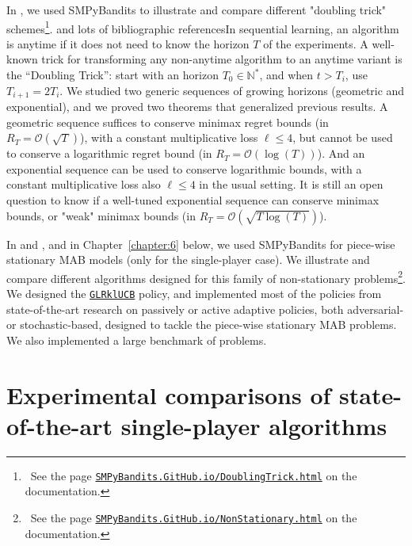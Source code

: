 In \cite{Besson2018DoublingTricks}, we used SMPyBandits to illustrate and compare different "doubling trick" schemes\footnote{~See the page \texttt{\href{https://SMPyBandits.GitHub.io/DoublingTrick.html}{SMPyBandits.GitHub.io/DoublingTrick.html}} on the documentation.}. and lots of bibliographic referencesIn sequential learning, an algorithm is anytime if it does not need to know the horizon $T$ of the experiments. A well-known trick for transforming any non-anytime algorithm to an anytime variant is the ``Doubling Trick'': start with an horizon $T_0\in\mathbb{N}^*$, and when $t > T_i$, use $T_{i+1} = 2 T_i$. We studied two generic sequences of growing horizons (geometric and exponential), and we proved two theorems that generalized previous results. A geometric sequence suffices to conserve minimax regret bounds (in $R_T = \mathcal{O}(\sqrt{T})$), with a constant multiplicative loss $\ell \leq 4$, but cannot be used to conserve a logarithmic regret bound (in $R_T = \mathcal{O}(\log(T))$). And an exponential sequence can be used to conserve logarithmic bounds, with a constant multiplicative loss also $\ell \leq 4$ in the usual setting. It is still an open question to know if a well-tuned exponential sequence can conserve minimax bounds, or "weak" minimax bounds (in $R_T = \mathcal{O}(\sqrt{T \log(T)})$).

In \cite{Besson2019GLRT} and \cite{Besson2019Gretsi}, and in Chapter~\ref{chapter:6} below, we used SMPyBandits for piece-wise stationary MAB models (only for the single-player case). We illustrate and compare different algorithms designed for this family of non-stationary problems\footnote{~See the page \texttt{\href{https://SMPyBandits.GitHub.io/NonStationary.html}{SMPyBandits.GitHub.io/NonStationary.html}} on the documentation.}.
We designed the \texttt{\href{https://SMPyBandits.GitHub.io/docs/Policies.GLR_UCB.html}{GLRklUCB}} policy, and implemented most of the policies from state-of-the-art research on passively or active adaptive policies, both adversarial- or stochastic-based, designed to tackle the piece-wise stationary MAB problems.
We also implemented a large benchmark of problems.


\section{Experimental comparisons of state-of-the-art single-player algorithms}
\label{sec:3:reviewSPAlgorithms}

